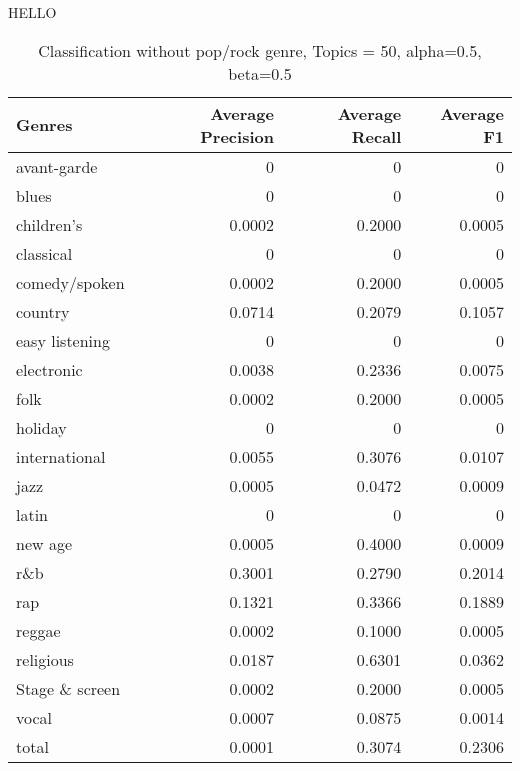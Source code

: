 HELLO
\begin{table}[h]
\begin{tabular}{|l|r|r|r|}

\hline
\textbf{Genres} &  \textbf{Average Precision} & \textbf{Average Recall} & \textbf{Average F1} \\
\hline
avant-garde	&	0 &	0 &	0\\
blues		&	0 &	0 &	0\\
children's	&	0.0002 &	0.2000 &	0.0005\\
classical	&	0 &	0 &	0\\
comedy/spoken	&	0.0002 &	0.2000 &	0.0005\\
country		&	0.0714 &	0.2079 &	0.1057\\
easy listening	&	0 &	0 &	0\\
electronic	&	0.0038 &	0.2336 &	0.0075\\
folk		&	0.0002 &	0.2000 &	0.0005\\
holiday		&	0 & 	0 &	0\\
international	&	0.0055 &	0.3076 &	0.0107\\
jazz		&	0.0005 &	0.0472 &	0.0009\\
latin		&	0 &	0 &	0\\
new age		&	0.0005 &	0.4000 &	0.0009\\
r\&b		&	0.3001 & 	0.2790 &	0.2014\\
rap		&	0.1321 &	0.3366 &	0.1889\\
reggae		&	0.0002 &	0.1000 &	0.0005\\
religious	&	0.0187 &	0.6301 &	0.0362\\
Stage \& screen	&	0.0002 &	0.2000 &	0.0005\\
vocal		&	0.0007 &	0.0875 &	0.0014\\
total		&	0.0001 &	0.3074 &	0.2306\\
\hline
\end{tabular}
\caption{Classification without pop/rock genre, Topics = 50, alpha=0.5, beta=0.5}
\end{table}